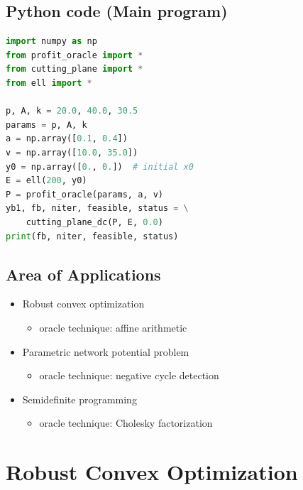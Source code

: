 \documentclass[]{article}
\providecommand{\tightlist}{%
  \setlength{\itemsep}{0pt}\setlength{\parskip}{0pt}}
\begin{document}
\hypertarget{python-code-main-program}{%
\subsection{Python code (Main program)}\label{python-code-main-program}}

\begin{lstlisting}[language=Python]
import numpy as np
from profit_oracle import *
from cutting_plane import *
from ell import *

p, A, k = 20.0, 40.0, 30.5
params = p, A, k
a = np.array([0.1, 0.4])
v = np.array([10.0, 35.0])
y0 = np.array([0., 0.])  # initial x0
E = ell(200, y0)
P = profit_oracle(params, a, v)
yb1, fb, niter, feasible, status = \
    cutting_plane_dc(P, E, 0.0)
print(fb, niter, feasible, status)
\end{lstlisting}

\hypertarget{area-of-applications}{%
\subsection{Area of Applications}\label{area-of-applications}}

\begin{itemize}
\tightlist
\item
  Robust convex optimization

  \begin{itemize}
  \tightlist
  \item
    oracle technique: affine arithmetic
  \end{itemize}
\item
  Parametric network potential problem

  \begin{itemize}
  \tightlist
  \item
    oracle technique: negative cycle detection
  \end{itemize}
\item
  Semidefinite programming

  \begin{itemize}
  \tightlist
  \item
    oracle technique: Cholesky factorization
  \end{itemize}
\end{itemize}

\hypertarget{robust-convex-optimization}{%
\section{Robust Convex Optimization}\label{robust-convex-optimization}}
\end{document}
